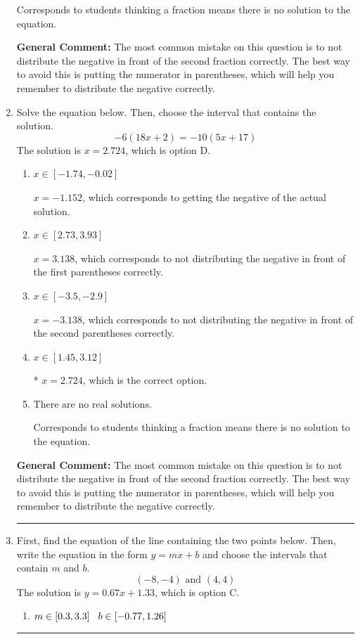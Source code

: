 \documentclass{extbook}[14pt]
\newcommand{\litem}[1]{\item #1

\rule{\textwidth}{0.4pt}}
\begin{document}
\begin{enumerate}
{\begin{enumerate}[label=\Alph*.]
Corresponds to students thinking a fraction means there is no solution to the equation.
\end{enumerate}

\textbf{General Comment:} The most common mistake on this question is to not distribute the negative in front of the second fraction correctly. The best way to avoid this is putting the numerator in parentheses, which will help you remember to distribute the negative correctly.
}
\litem{
Solve the equation below. Then, choose the interval that contains the solution.
\[ -6(18x + 2) = -10(5x + 17) \]The solution is \( x = 2.724 \), which is option D.\begin{enumerate}[label=\Alph*.]
\item \( x \in [-1.74, -0.02] \)

$x = -1.152$, which corresponds to getting the negative of the actual solution.
\item \( x \in [2.73, 3.93] \)

$x = 3.138$, which corresponds to not distributing the negative in front of the first parentheses correctly.
\item \( x \in [-3.5, -2.9] \)

$x = -3.138$, which corresponds to not distributing the negative in front of the second parentheses correctly.
\item \( x \in [1.45, 3.12] \)

* $x = 2.724$, which is the correct option.
\item \( \text{There are no real solutions.} \)

Corresponds to students thinking a fraction means there is no solution to the equation.
\end{enumerate}

\textbf{General Comment:} The most common mistake on this question is to not distribute the negative in front of the second fraction correctly. The best way to avoid this is putting the numerator in parentheses, which will help you remember to distribute the negative correctly.
}
\litem{
First, find the equation of the line containing the two points below. Then, write the equation in the form $ y=mx+b $ and choose the intervals that contain $m$ and $b$.
\[ (-8, -4) \text{ and } (4, 4) \]The solution is \( y = 0.67x + 1.33 \), which is option C.\begin{enumerate}[label=\Alph*.]
\item \( m \in [0.3, 3.3] \hspace*{3mm} b \in [-0.77, 1.26] \)


\end{enumerate}}
\end{enumerate}
\end{document}
